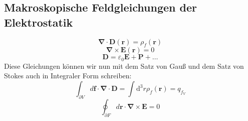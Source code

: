 \documentclass[titlepage,11pt,a4paper,ngerman]{report}
\newcommand{\tx}[1]{\textrm{#1}}
\newcommand{\dd}{\tx{d}}
\renewcommand{\vec}[1]{\boldsymbol{#1}}
\renewcommand{\epsilon}{\varepsilon}
\newcommand{\vabla}{\boldsymbol{\nabla}}
\begin{document}
\subsection{Makroskopische Feldgleichungen der Elektrostatik}

\begin{equation*}
\vabla \cdot \vec{D}(\vec{r}) = \rho_f (\vec{r})
\end{equation*}
\begin{equation*}
\vabla \times \vec{E}(\vec{r}) = 0
\end{equation*}
\begin{equation*}
\vec{D} = \epsilon_0 \vec{E} + \vec{P} + \dots
\end{equation*}
Diese Gleichungen können wir nun mit dem Satz von Gauß und dem Satz von Stokes auch in Integraler Form schreiben:
\begin{equation*}
\int_{\partial V} d\vec{f} \cdot \vabla \cdot \vec{D} = \int \dd^3 r \rho_f(\vec{r}) = q_{f_V}
\end{equation*}
\begin{equation*}
\oint_{\partial F} d\vec{r} \cdot \vabla \times \vec{E} = 0
\end{equation*}
\end{document}
